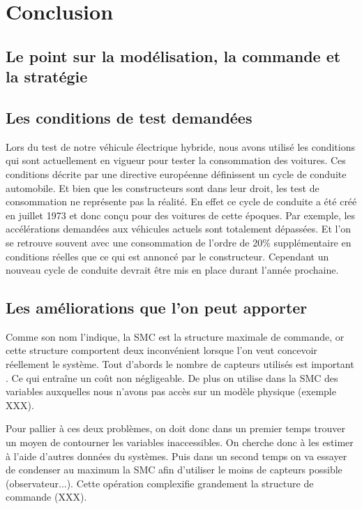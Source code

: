 \section{Conclusion}

\subsection{Le point sur la modélisation, la commande et la stratégie}


\subsection{Les conditions de test demandées}

Lors du test de notre véhicule électrique hybride, nous avons utilisé les conditions qui sont actuellement en vigueur pour tester la consommation des voitures. Ces conditions décrite par une directive européenne définissent un cycle de conduite automobile. Et bien que les constructeurs sont dans leur droit, les test de consommation ne représente pas la réalité. En effet ce cycle de conduite a été créé en juillet 1973 et donc conçu pour des voitures de cette époques. Par exemple, les accélérations demandées aux véhicules actuels sont totalement dépassées. Et l'on se retrouve souvent avec une consommation de l'ordre de 20\% supplémentaire en conditions réelles que ce qui est annoncé par le constructeur. Cependant un nouveau cycle de conduite devrait être mis en place durant l'année prochaine. 


\subsection{Les améliorations que l'on peut apporter}

Comme son nom l'indique, la SMC est la structure maximale de commande, or cette structure comportent deux inconvénient lorsque l'on veut concevoir réellement le système. Tout d'abords le nombre de capteurs utilisés est important . Ce qui entraîne un coût non négligeable. De plus on utilise dans la SMC des variables auxquelles nous n'avons pas accès sur un modèle physique (exemple XXX). 

Pour pallier à ces deux problèmes, on doit donc dans un premier temps trouver un moyen de contourner les variables inaccessibles. On cherche donc à les estimer à l'aide d'autres données du systèmes. Puis dans un second temps on va essayer de condenser au maximum la SMC afin d'utiliser le moins de capteurs possible (observateur...). Cette opération complexifie grandement la structure de commande (XXX). 





